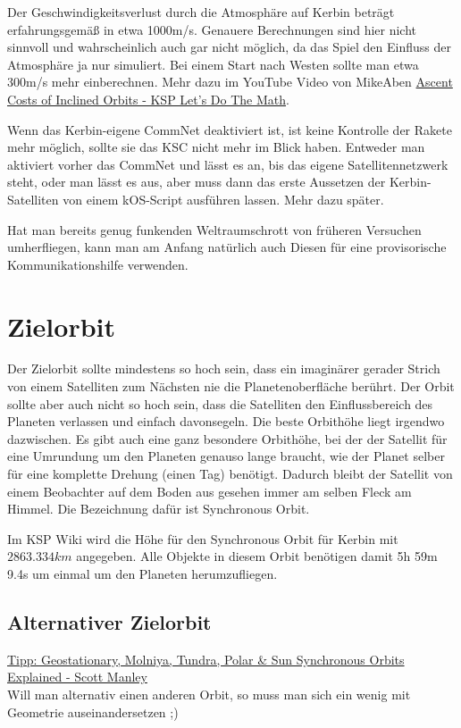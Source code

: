 \documentclass[12pt,paper=A4,numbers=noenddot,bibliography=totoc,listof=totoc,DIV=11,BCOR=1mm]{scrreprt}
\newcommand{\gq}[1]{\glqq #1\grqq} %
\begin{document}
Der Geschwindigkeitsverlust durch die Atmosphäre auf Kerbin beträgt erfahrungsgemäß in etwa 1000m/s. Genauere Berechnungen sind hier nicht sinnvoll und wahrscheinlich auch gar nicht möglich, da das Spiel den Einfluss der Atmosphäre ja nur simuliert. Bei einem Start nach Westen sollte man etwa 300m/s mehr einberechnen. Mehr dazu im YouTube Video von MikeAben \href{https://youtu.be/0BtbYVtZ9ac}{Ascent Costs of Inclined Orbits - KSP Let's Do The Math}.

Wenn das Kerbin-eigene CommNet deaktiviert ist, ist keine Kontrolle der Rakete mehr möglich, sollte sie das KSC nicht mehr im Blick haben. Entweder man aktiviert vorher das CommNet und lässt es an, bis das eigene Satellitennetzwerk steht, oder man lässt es aus, aber muss dann das erste Aussetzen der Kerbin-Satelliten von einem kOS-Script ausführen lassen. Mehr dazu später.

Hat man bereits genug funkenden Weltraumschrott von früheren Versuchen umherfliegen, kann man am Anfang natürlich auch Diesen für eine provisorische Kommunikationshilfe verwenden.

\section{Zielorbit}
Der Zielorbit sollte mindestens so hoch sein, dass ein imaginärer gerader Strich von einem Satelliten zum Nächsten nie die Planetenoberfläche berührt. Der Orbit sollte aber auch nicht so hoch sein, dass die Satelliten den Einflussbereich des Planeten verlassen und einfach davonsegeln. Die beste Orbithöhe liegt irgendwo dazwischen. Es gibt auch eine ganz besondere Orbithöhe, bei der der Satellit für eine Umrundung um den Planeten genauso lange braucht, wie der Planet selber für eine komplette Drehung (einen Tag) benötigt. Dadurch bleibt der Satellit von einem Beobachter auf dem Boden aus gesehen immer am selben Fleck am Himmel. Die Bezeichnung dafür ist \gq{Synchronous Orbit}.

Im KSP Wiki wird die Höhe für den Synchronous Orbit für Kerbin mit $2863.334km$ angegeben. Alle Objekte in diesem Orbit benötigen damit 5h 59m 9.4s um einmal um den Planeten herumzufliegen.

\subsection{Alternativer Zielorbit}
\href{https://youtu.be/PZAkiXNJIqc}{Tipp: Geostationary, Molniya, Tundra, Polar \& Sun Synchronous Orbits Explained - Scott Manley}\\
Will man alternativ einen anderen Orbit, so muss man sich ein wenig mit Geometrie auseinandersetzen ;)
\end{document}
